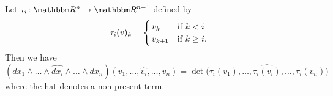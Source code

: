 \begin{lemma}    \label{LEMooICRXooFKPCRd}
    Let \( \tau_i\colon \eR^n\to \eR^{n-1}\) defined by
    \begin{equation}
        \tau_i(v)_k=\begin{cases}
            v_k    &   \text{if \( k<i\)}\\
            v_{k+1}    &    \text{if \( k\geq i\).}
        \end{cases}
    \end{equation}
    Then we have
    \begin{equation}
        (dx_1\wedge\ldots\wedge\widehat{dx_i}\wedge\ldots\wedge dx_n)(v_1,\ldots, \widehat{v_i},\ldots, v_n)=
        \det\Big(  \tau_i(v_1),\ldots, \widehat{\tau_i(v_i)},\ldots, \tau_i(v_n)  \Big)
    \end{equation}
    where the hat denotes a non present term.
\end{lemma}

